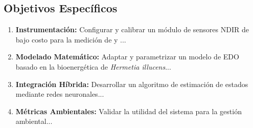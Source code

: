 \documentclass[10pt,spanish,fleqn,openany,twoside,letterpaper]{book}
\begin{document}
    \subsection{Objetivos Específicos}
    \begin{enumerate}
        \item \textbf{Instrumentación:} Configurar y calibrar un módulo de sensores NDIR de bajo costo para la medición de  y ...
        \item \textbf{Modelado Matemático:} Adaptar y parametrizar un modelo de EDO basado en la bioenergética de \textit{Hermetia illucens}...
        \item \textbf{Integración Híbrida:} Desarrollar un algoritmo de estimación de estados mediante redes neuronales...
        \item \textbf{Métricas Ambientales:} Validar la utilidad del sistema para la gestión ambiental...
    \end{enumerate}




\end{document}
